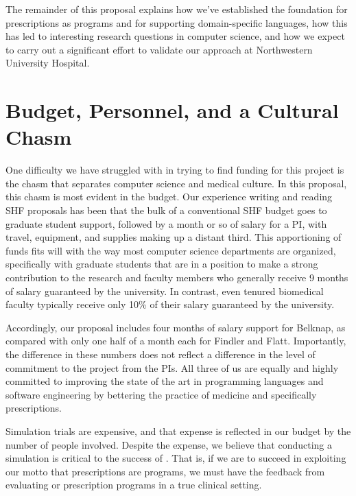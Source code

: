 \documentclass[11pt]{article}
\begin{document}
The remainder of this proposal explains how we've established the
foundation for prescriptions as programs and for supporting
domain-specific languages, how this has led to interesting research
questions in computer science, and how we expect to carry out a
significant effort to validate our approach at Northwestern University
Hospital.







\section{Budget, Personnel, and a Cultural Chasm}

One difficulty we have struggled with in trying to find funding for
this project is the chasm that separates computer science and medical
culture.
%
In this proposal, this chasm is most evident in the budget. 
%
Our experience writing and reading SHF proposals has been that the
bulk of a conventional SHF budget goes to graduate student support,
followed by a month or so of salary for a PI, with travel,
equipment, and supplies making up a distant third.
%
This apportioning of funds fits will with the way most computer
science departments are organized, specifically with graduate students
that are in a position to make a strong contribution to the research
and faculty members who generally receive 9 months of salary
guaranteed by the university.
%
In contrast, even tenured biomedical faculty typically receive only
10\% of their salary guaranteed by the university.

Accordingly, our proposal includes four months of salary support for
Belknap, as compared with only one half of a month each for Findler
and Flatt.
%
Importantly, the difference in these numbers does not reflect a
difference in the level of commitment to the project from the PIs.
%
All three of us are equally and highly committed to improving the
state of the art in programming languages and software engineering by
bettering the practice of medicine and specifically prescriptions.


Simulation trials are expensive, and that expense is reflected in our
budget by the number of people involved.
%
Despite the expense, we believe that conducting a simulation is
critical to the success of \poppl{}.
%
That is, if we are to succeed in exploiting our motto that
prescriptions are programs, we must have the feedback from evaluating
or prescription programs in a true clinical setting.
\end{document}
